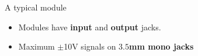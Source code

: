 \documentclass{beamer}
\begin{document}
\begin{frame}{A typical module}
    \begin{figure}
       \centering
       \hspace{1cm}
    \end{figure}

    \begin{itemize}
        \item Modules have \textbf{input} and \textbf{output} jacks.
        \item Maximum $\pm$10V signals on \textbf{$3.5$mm mono jacks}
    \end{itemize}


\end{frame}
\end{document}
